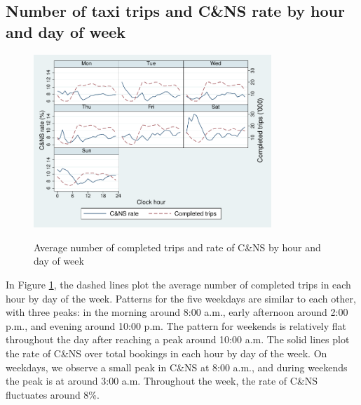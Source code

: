 \documentclass[reviewmode,AEJ]{AEA}
\begin{document}
\begin{appendices}
\section{Number of taxi trips and C\&NS rate by hour and day of week}
\FloatBarrier
\begin{figure}[!ht]
	\centering
	\caption{Average number of completed trips and rate of C\&NS by hour and day of week}%
	\includegraphics[width=0.8\textwidth]{./fg/dowplot.pdf}
	\label{fg:trips}
\end{figure}

In Figure \ref{fg:trips}, the dashed lines plot the average number of completed trips in each hour by day
of the week. Patterns for the five weekdays are similar to each other, with three peaks: in the morning 
around 8:00 a.m., early afternoon around 2:00 p.m., and evening around 10:00 p.m. The pattern for weekends 
is relatively flat throughout the day after reaching a peak around 10:00 a.m. The solid lines plot the rate 
of C\&NS over total bookings in each hour by day of the week. On weekdays, we observe a small peak in C\&NS 
at 8:00 a.m., and during weekends the peak is at around 3:00 a.m. Throughout the week, the rate of C\&NS 
fluctuates around 8\%.

\FloatBarrier






\end{appendices}
\end{document}

